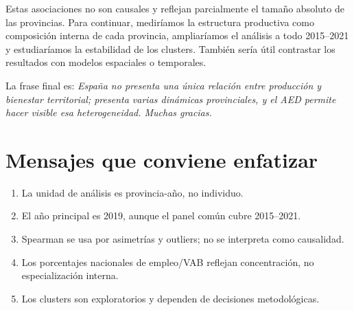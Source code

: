 \documentclass[11pt,a4paper]{article}
\begin{document}
Estas asociaciones no son causales y reflejan parcialmente el tamaño absoluto de las provincias. Para continuar, mediríamos la estructura productiva como composición interna de cada provincia, ampliaríamos el análisis a todo 2015--2021 y estudiaríamos la estabilidad de los clusters. También sería útil contrastar los resultados con modelos espaciales o temporales.

La frase final es: \emph{España no presenta una única relación entre producción y bienestar territorial; presenta varias dinámicas provinciales, y el AED permite hacer visible esa heterogeneidad. Muchas gracias.}

\section{Mensajes que conviene enfatizar}
\begin{enumerate}[leftmargin=1.6em]
\item La unidad de análisis es provincia-año, no individuo.
\item El año principal es 2019, aunque el panel común cubre 2015--2021.
\item Spearman se usa por asimetrías y outliers; no se interpreta como causalidad.
\item Los porcentajes nacionales de empleo/VAB reflejan concentración, no especialización interna.
\item Los clusters son exploratorios y dependen de decisiones metodológicas.
\end{enumerate}
\end{document}
